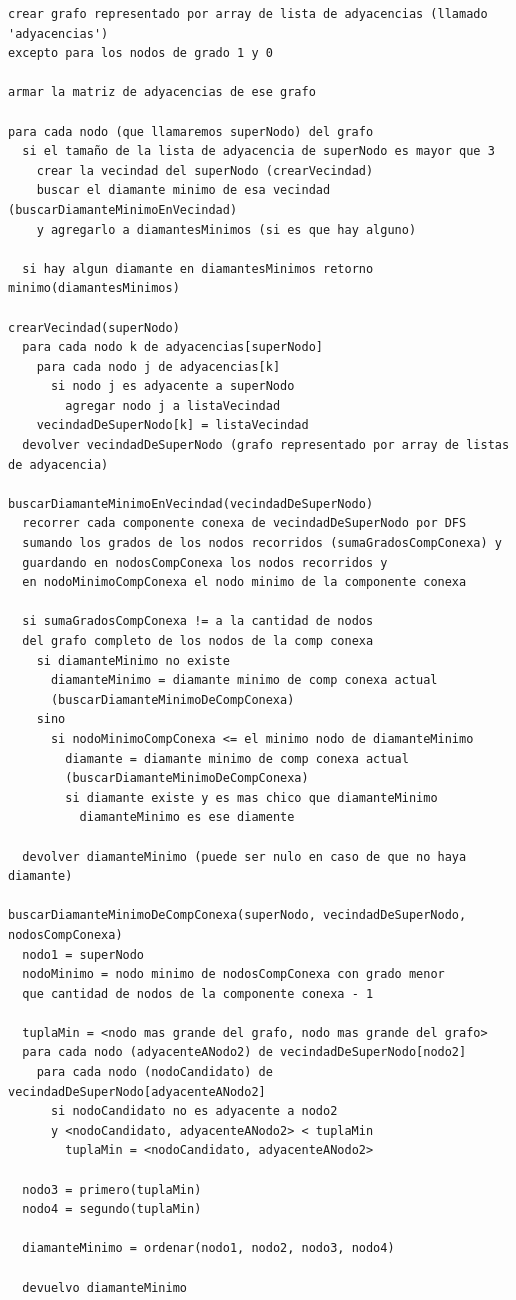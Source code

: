 \documentclass[a4paper,11pt] {article}
\begin{document}
\begin{verbatim}
crear grafo representado por array de lista de adyacencias (llamado 'adyacencias')
excepto para los nodos de grado 1 y 0

armar la matriz de adyacencias de ese grafo

para cada nodo (que llamaremos superNodo) del grafo
  si el tamaño de la lista de adyacencia de superNodo es mayor que 3
    crear la vecindad del superNodo (crearVecindad)
    buscar el diamante minimo de esa vecindad (buscarDiamanteMinimoEnVecindad)
    y agregarlo a diamantesMinimos (si es que hay alguno)

  si hay algun diamante en diamantesMinimos retorno minimo(diamantesMinimos)

crearVecindad(superNodo)
  para cada nodo k de adyacencias[superNodo]
    para cada nodo j de adyacencias[k]
      si nodo j es adyacente a superNodo
        agregar nodo j a listaVecindad
    vecindadDeSuperNodo[k] = listaVecindad
  devolver vecindadDeSuperNodo (grafo representado por array de listas de adyacencia)

buscarDiamanteMinimoEnVecindad(vecindadDeSuperNodo)
  recorrer cada componente conexa de vecindadDeSuperNodo por DFS
  sumando los grados de los nodos recorridos (sumaGradosCompConexa) y
  guardando en nodosCompConexa los nodos recorridos y
  en nodoMinimoCompConexa el nodo minimo de la componente conexa

  si sumaGradosCompConexa != a la cantidad de nodos
  del grafo completo de los nodos de la comp conexa
    si diamanteMinimo no existe
      diamanteMinimo = diamante minimo de comp conexa actual 
      (buscarDiamanteMinimoDeCompConexa)
    sino
      si nodoMinimoCompConexa <= el minimo nodo de diamanteMinimo
        diamante = diamante minimo de comp conexa actual 
        (buscarDiamanteMinimoDeCompConexa)
        si diamante existe y es mas chico que diamanteMinimo
          diamanteMinimo es ese diamente

  devolver diamanteMinimo (puede ser nulo en caso de que no haya diamante)

buscarDiamanteMinimoDeCompConexa(superNodo, vecindadDeSuperNodo, nodosCompConexa)
  nodo1 = superNodo
  nodoMinimo = nodo minimo de nodosCompConexa con grado menor 
  que cantidad de nodos de la componente conexa - 1

  tuplaMin = <nodo mas grande del grafo, nodo mas grande del grafo>
  para cada nodo (adyacenteANodo2) de vecindadDeSuperNodo[nodo2]
    para cada nodo (nodoCandidato) de vecindadDeSuperNodo[adyacenteANodo2]
      si nodoCandidato no es adyacente a nodo2 
      y <nodoCandidato, adyacenteANodo2> < tuplaMin
        tuplaMin = <nodoCandidato, adyacenteANodo2>

  nodo3 = primero(tuplaMin)
  nodo4 = segundo(tuplaMin)

  diamanteMinimo = ordenar(nodo1, nodo2, nodo3, nodo4)

  devuelvo diamanteMinimo

\end{verbatim}
\end{document}
